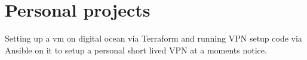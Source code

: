 \documentclass[]{font}
\begin{document}
\begin{minipage}[t]{0.66\textwidth}



\sectionsep



\section{Personal projects}

Setting up a vm on digital ocean via Terraform and running VPN setup code via Ansible on it to setup a personal short lived VPN at a moments notice.
\sectionsep





\end{minipage} 
\end{document}
